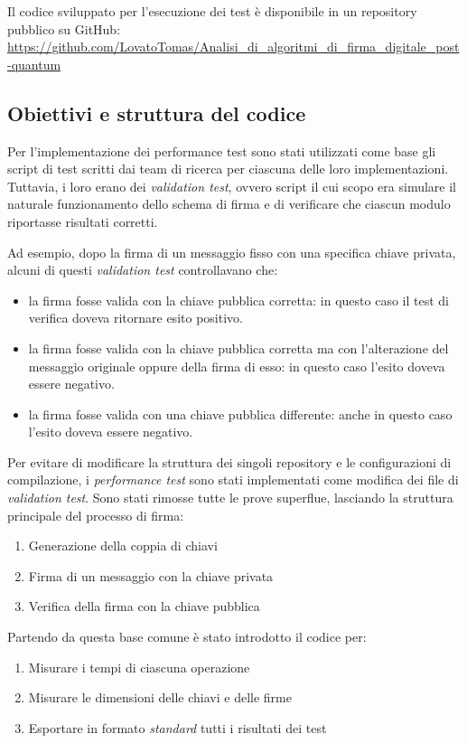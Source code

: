 Il codice sviluppato per l'esecuzione dei test è disponibile in un repository pubblico su GitHub: \url{https://github.com/LovatoTomas/Analisi_di_algoritmi_di_firma_digitale_post-quantum} \cite{project-github}

\subsection{Obiettivi e struttura del codice}

Per l'implementazione dei performance test sono stati utilizzati come base gli script di test scritti dai team di ricerca per ciascuna delle loro implementazioni. Tuttavia, i loro erano dei \textit{validation test}, ovvero script il cui scopo era simulare il naturale funzionamento dello schema di firma e di verificare che ciascun modulo riportasse risultati corretti.

Ad esempio, dopo la firma di un messaggio fisso con una specifica chiave privata, alcuni di questi \textit{validation test} controllavano che:
\begin{itemize}
    \item la firma fosse valida con la chiave pubblica corretta: in questo caso il test di verifica doveva ritornare esito positivo.
    \item la firma fosse valida con la chiave pubblica corretta ma con l'alterazione del messaggio originale oppure della firma di esso: in questo caso l'esito doveva essere negativo.
    \item la firma fosse valida con una chiave pubblica differente: anche in questo caso l'esito doveva essere negativo.
\end{itemize}

Per evitare di modificare la struttura dei singoli repository e le configurazioni di compilazione, i \textit{performance test} sono stati implementati come modifica dei file di \textit{validation test}. Sono stati rimosse tutte le prove superflue, lasciando la struttura principale del processo di firma:
\begin{enumerate}
    \item Generazione della coppia di chiavi
    \item Firma di un messaggio con la chiave privata
    \item Verifica della firma con la chiave pubblica
\end{enumerate}

Partendo da questa base comune è stato introdotto il codice per:
\begin{enumerate}
    \item Misurare i tempi di ciascuna operazione
    \item Misurare le dimensioni delle chiavi e delle firme
    \item Esportare in formato \textit{standard} tutti i risultati dei test
\end{enumerate}

